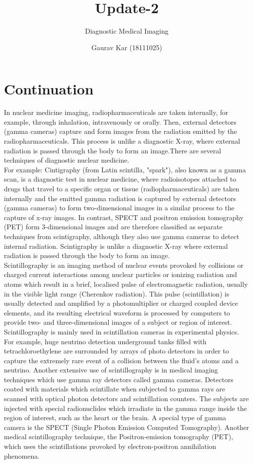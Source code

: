 \documentclass{article}
\title{Update-2}
\author{Diagnostic Medical Imaging}
\date{Gaurav Kar (18111025)}
\begin{document}
\maketitle

\section{Continuation}
In nuclear medicine imaging, radiopharmaceuticals are taken internally, for example, through inhalation, intravenously or orally. Then, external detectors (gamma cameras) capture and form images from the radiation emitted by the radiopharmaceuticals. This process is unlike a diagnostic X-ray, where external radiation is passed through the body to form an image.There are several techniques of diagnostic nuclear medicine.\\For example: Cintigraphy (from Latin scintilla, "spark"), also known as a gamma scan, is a diagnostic test in nuclear medicine, where radioisotopes attached to drugs that travel to a specific organ or tissue (radiopharmaceuticals) are taken internally and the emitted gamma radiation is captured by external detectors (gamma cameras) to form two-dimensional images in a similar process to the capture of x-ray images. In contrast, SPECT and positron emission tomography (PET) form 3-dimensional images and are therefore classified as separate techniques from scintigraphy, although they also use gamma cameras to detect internal radiation. Scintigraphy is unlike a diagnostic X-ray where external radiation is passed through the body to form an image.\\Scintillography is an imaging method of nuclear events provoked by collisions or charged current interactions among nuclear particles or ionizing radiation and atoms which result in a brief, localised pulse of electromagnetic radiation, usually in the visible light range (Cherenkov radiation). This pulse (scintillation) is usually detected and amplified by a photomultiplier or charged coupled device elements, and its resulting electrical waveform is processed by computers to provide two- and three-dimensional images of a subject or region of interest. Scintillography is mainly used in scintillation cameras in experimental physics. For example, huge neutrino detection underground tanks filled with tetrachloroethylene are surrounded by arrays of photo detectors in order to capture the extremely rare event of a collision between the fluid's atoms and a neutrino. Another extensive use of scintillography is in medical imaging techniques which use gamma ray detectors called gamma cameras. Detectors coated with materials which scintillate when subjected to gamma rays are scanned with optical photon detectors and scintillation counters. The subjects are injected with special radionuclides which irradiate in the gamma range inside the region of interest, such as the heart or the brain. A special type of gamma camera is the SPECT (Single Photon Emission Computed Tomography). Another medical scintillography technique, the Positron-emission tomography (PET), which uses the scintillations provoked by electron-positron annihilation phenomena.
\end{document}
